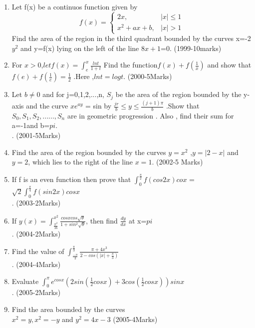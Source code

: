 \documentclass[journal,12pt,twocolumn]{IEEEtran}
\theoremstyle{remark}
\begin{document}
\begin{enumerate}
							      \item Let f(x) be a continuos function given by \\
 \[							
f(x)=
\begin{cases}
2x,&|x|\le1\\
x^2+ax+b,&|x|>1
\end{cases}
\]
Find the area of the region in the third quadrant bounded by the curves x=-2$y^2$ and y=f(x) lying on the left of the line $8x+1$=0.  
\hfill{(1999-10marks)}\\
							       \item For $x > 0 $,$
let f(x)=\int_{e}^{x}\frac{lnt}{1+t}$
Find the function$ f(x) + f(\frac{1}{x})$
 and show that $f(e)+f(\frac{1}{e})= \frac{1}{2}$ .Here ,$lnt=log t$.
\hfill{(2000-5Marks)}
															    \item Let $b\neq0$ and for j=0,1,2,...,n, $S_j$ be the area of the region bounded by the y-axis and the curve $xe^{ay}$ = sin by $\frac{jr}{b} \le y \le \frac{(j+1)\pi}{b}$ .Show that  $S_0,S_1,S_2,......,S_n$ are in geometric progression . Also , find their sum for a=-1and b=$pi$.\\.
\hfill{(2001-5Marks)}
								\item Find the area of the region bounded by the curves $y=x^2$ ,$y=|2-x|$ and $y=2$, which lies to the right of the line $x=1$.
\hfill{(2002-5 Marks) }
								\item If f is an even function then prove that $\int_{0}^{\frac{\pi}{2}}f(cos2x)cox $ =$\sqrt{2}\int_{0}^{\frac{\pi}{4}}f(sin2x)cosx$\\.
\hfill{(2003-2Marks)}
		
								\item If $y(x)=\int_{\frac{\pi^2}{16}}^{x^2}\frac{cosxcos\sqrt{\theta}}{1+sin^2\sqrt{\theta}}$, then find $\frac{dy}{dx}$ at x=$pi$\\.
								  \hfill{(2004-2Marks)}

\item  Find the value of $\int_{\frac{-\pi}{3}}^{\frac{\pi}{3}}\frac{\pi+4x^3}{2-cos(|x|+\frac{\pi}{3})}$\\.
 \hfill{(2004-4Marks)}

\item Evaluate $\int_{0}^{\pi}e^{cosx}(2sin(\frac{1}{2}cosx)+3cos(\frac{1}{2}cosx))sinx$\\.
								 \hfill{(2005-2Marks)}
							
\item Find the area bounded by the curves \\  $x^2=y,x^2=-y$ and $y^2=4x-3$				          
\hfill{(2005-4Marks)}
							

\end{enumerate}
\end{document}
